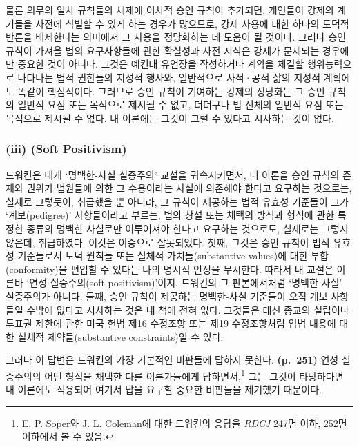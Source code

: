 물론 의무의 일차 규칙들의 체제에 이차적 승인 규칙이 추가되면, 개인들이
강제의 계기들을 사전에 식별할 수 있게 하는 경우가 많으므로, 강제 사용에
대한 하나의 도덕적 반론을 배제한다는 의미에서 그 사용을 정당화하는 데
도움이 될 것이다. 그러나 승인 규칙이 가져올 법의 요구사항들에 관한
확실성과 사전 지식은 강제가 문제되는 경우에만 중요한 것이 아니다. 그것은
예컨대 유언장을 작성하거나 계약을 체결할 행위능력으로 나타나는 법적
권한들의 지성적 행사와, 일반적으로 사적·공적 삶의 지성적 계획에도 똑같이
핵심적이다. 그러므로 승인 규칙이 기여하는 강제의 정당화는 그 승인 규칙의
일반적 요점 또는 목적으로 제시될 수 없고, 더더구나 법 전체의 일반적 요점
또는 목적으로 제시될 수 없다. 내 이론에는 그것이 그럴 수 있다고 시사하는
것이 없다.

\subsubsection{\texorpdfstring{(iii)  (Soft
Positivism)}{(iii) 연성 실증주의 (Soft Positivism)}}\label{iii-uxc5f0uxc131-uxc2e4uxc99duxc8fcuxc758-soft-positivism}

드워킨은 내게 ‘명백한-사실 실증주의’ 교설을 귀속시키면서, 내 이론을 승인
규칙의 존재와 권위가 법원들에 의한 그 수용이라는 사실에 의존해야 한다고
요구하는 것으로는, 실제로 그렇듯이, 취급했을 뿐 아니라, 그 규칙이
제공하는 법적 유효성 기준들이 그가 ‘계보(pedigree)’ 사항들이라고 부르는,
법의 창설 또는 채택의 방식과 형식에 관한 특정한 종류의 명백한 사실로만
이루어져야 한다고 요구하는 것으로도, 실제로는 그렇지 않은데, 취급하였다.
이것은 이중으로 잘못되었다. 첫째, 그것은 승인 규칙이 법적 유효성
기준들로서 도덕 원칙들 또는 실체적 가치들(substantive values)에 대한
부합(conformity)을 편입할 수 있다는 나의 명시적 인정을 무시한다. 따라서
내 교설은 이른바 ‘연성 실증주의(soft positivism)’이지, 드워킨의 그
판본에서처럼 ‘명백한-사실’ 실증주의가 아니다. 둘째, 승인 규칙이 제공하는
명백한-사실 기준들이 오직 계보 사항들일 수밖에 없다고 시사하는 것은 내
책에 전혀 없다. 그것들은 대신 종교의 설립이나 투표권 제한에 관한 미국
헌법 제16 수정조항 또는 제19 수정조항처럼 입법 내용에 대한 실체적
제약들(substantive constraints)일 수 있다.

그러나 이 답변은 드워킨의 가장 기본적인 비판들에 답하지 못한다.
\textbf{(p.~251)} 연성 실증주의의 어떤 형식을 채택한 다른 이론가들에게
답하면서,\footnote{E. P. Soper와 J. L. Coleman에 대한 드워킨의 응답을
  \emph{RDCJ} 247면 이하, 252면 이하에서 볼 수 있음.} 그는 그것이
타당하다면 내 이론에도 적용되어 여기서 답을 요구할 중요한 비판들을
제기했기 때문이다.

